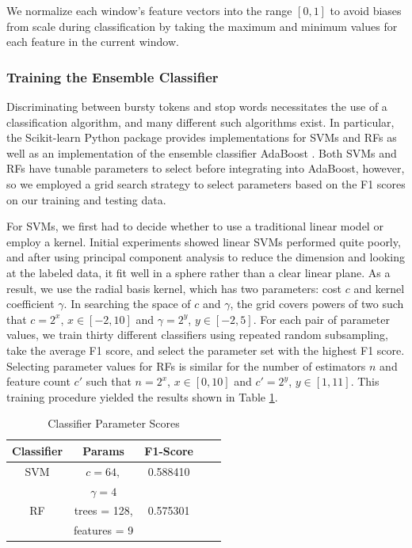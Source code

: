 \documentclass{sig-alternate}
\begin{document}
We normalize each window's feature vectors into the range $[0, 1]$ to avoid biases from scale during classification by taking the maximum and minimum values for each feature in the current window.

\subsubsection{Training the Ensemble Classifier}

Discriminating between bursty tokens and stop words necessitates the use of a classification algorithm, and many different such algorithms exist.
In particular, the Scikit-learn Python package provides implementations for SVMs and RFs as well as an implementation of the ensemble classifier AdaBoost \cite{scikit-learn}.
Both SVMs and RFs have tunable parameters to select before integrating into AdaBoost, however, so we employed a grid search strategy to select parameters based on the F1 scores on our training and testing data.

For SVMs, we first had to decide whether to use a traditional linear model or employ a kernel.
Initial experiments showed linear SVMs performed quite poorly, and after using principal component analysis to reduce the dimension and looking at the labeled data, it fit well in a sphere rather than a clear linear plane. 
As a result, we use the radial basis kernel, which has two parameters: cost $c$ and kernel coefficient $\gamma$.
In searching the space of $c$ and $\gamma$, the grid covers powers of two such that $c = 2^x$, $x \in [-2, 10]$ and $\gamma = 2^y$, $y \in [-2, 5]$.
For each pair of parameter values, we train thirty different classifiers using repeated random subsampling, take the average F1 score, and select the parameter set with the highest F1 score.
Selecting parameter values for RFs is similar for the number of estimators $n$ and feature count $c'$ such that $n = 2^x$, $x \in [0, 10]$ and $c' = 2^y$, $y \in [1, 11]$.
This training procedure yielded the results shown in Table \ref{tab:scores}.

\begin{table}[htdp]
\caption{Classifier Parameter Scores}
\begin{center}
\begin{tabular}{|c|c|c|c|c|}
\hline
\textbf{Classifier} & \textbf{Params} & \textbf{F1-Score} \\ \hline
SVM & $c=64,$ & 0.588410 \\ 
& $\gamma=4$ & \\ \hline
RF & trees = 128, & 0.575301 \\
& features = 9 &  \\ \hline
\end{tabular}
\end{center}
\label{tab:scores}
\end{table}
\end{document}
